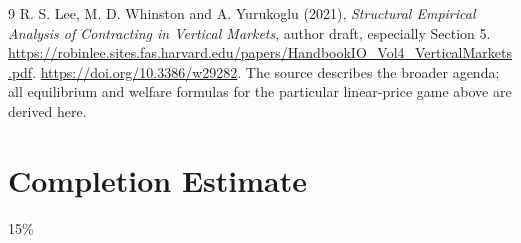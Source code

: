 \documentclass[11pt]{article}
\theoremstyle{definition}
\theoremstyle{remark}
\begin{document}
\begin{thebibliography}{9}
 R. S. Lee, M. D. Whinston and A. Yurukoglu (2021), \emph{Structural Empirical Analysis of Contracting in Vertical Markets}, author draft, especially Section 5. \url{https://robinlee.sites.fas.harvard.edu/papers/HandbookIO_Vol4_VerticalMarkets.pdf}. \url{https://doi.org/10.3386/w29282}. The source describes the broader agenda; all equilibrium and welfare formulas for the particular linear-price game above are derived here.
\end{thebibliography}
\section{Completion Estimate}
15\%
\end{document}
